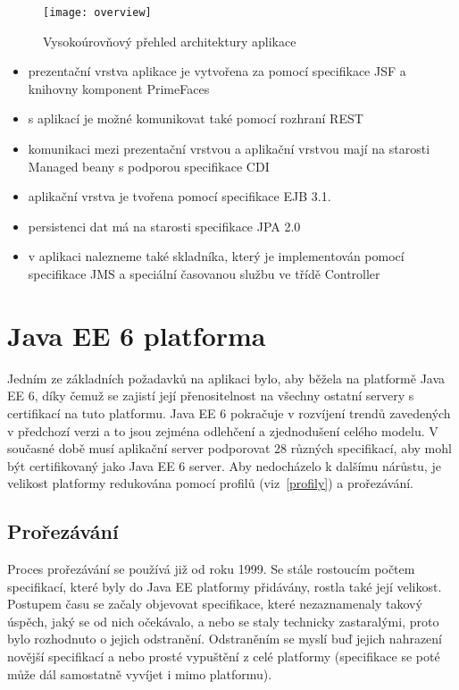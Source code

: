 \documentclass[122pt,oneside]{fithesis}
\begin{document}
\begin{figure}[!ht]
\centering
\texttt{[image: overview]}
\caption{Vysokoúrovňový přehled architektury aplikace}
\label{img:overview}
\end{figure}

\begin{itemize}
  \item prezentační vrstva aplikace je vytvořena za pomocí specifikace JSF a knihovny komponent PrimeFaces
  \item s aplikací je možné komunikovat také pomocí rozhraní REST
  \item komunikaci mezi prezentační vrstvou a aplikační vrstvou mají na starosti Managed beany s podporou specifikace CDI
  \item aplikační vrstva je tvořena pomocí specifikace EJB 3.1.
  \item persistenci dat má na starosti specifikace JPA 2.0
  \item v aplikaci nalezneme také skladníka, který je implementován pomocí specifikace JMS a speciální časovanou službu ve třídě Controller
\end{itemize}

\section{Java EE 6 platforma}
Jedním ze základních požadavků na aplikaci bylo, aby běžela na platformě Java EE 6, díky čemuž se zajistí její přenositelnost na všechny ostatní servery s certifikací na tuto platformu. Java EE 6 pokračuje v rozvíjení trendů zavedených v předchozí verzi a to jsou zejména odlehčení a zjednodušení celého modelu. V současné době musí aplikační server podporovat 28 různých specifikací, aby mohl být certifikovaný jako Java EE 6 server. Aby nedocházelo k dalšímu nárůstu, je velikost platformy redukována pomocí profilů (viz~\ref{profily}) a prořezávání. 
\subsection{Prořezávání}
\label{pruning}
Proces prořezávání se používá již od roku 1999. Se stále rostoucím počtem specifikací, které byly do Java EE platformy přidávány, rostla také její velikost. Postupem času se začaly objevovat specifikace, které nezaznamenaly takový úspěch, jaký se od nich očekávalo, a nebo se staly technicky zastaralými, proto bylo rozhodnuto o jejich odstranění. Odstraněním se myslí buď jejich nahrazení novější specifikací a nebo prosté vypuštění z celé platformy (specifikace se poté může dál samostatně vyvíjet i mimo platformu).
\end{document}
